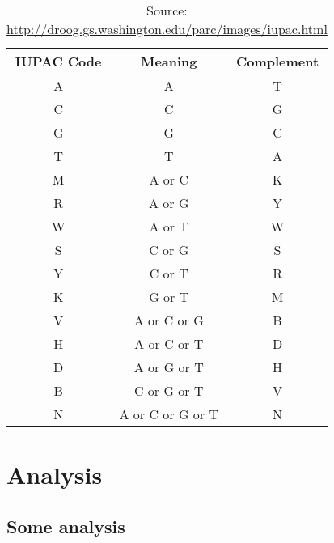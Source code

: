 \documentclass[12pt,a4paper]{article}
\begin{document}
\begin{table}[h!]
    \centering
    \begin{tabular}{|c|c|c|}
    \hline
    IUPAC Code & Meaning & Complement\\
\hline
A & A & T\\
\hline
C & C & G\\
\hline
G & G & C\\
\hline
T & T & A\\
\hline
M & A or C & K\\
\hline
R & A or G & Y\\
\hline
W & A or T & W\\
\hline
S & C or G & S\\
\hline
Y & C or T & R\\
\hline
K & G or T & M\\
\hline
V & A or C or G & B\\
\hline
H & A or C or T & D\\
\hline
D & A or G or T & H\\
\hline
B & C or G or T & V\\
\hline
N & A or C or G or T& N\\
\hline
    \end{tabular}
    \caption{Source: 
    \url{http://droog.gs.washington.edu/parc/images/iupac.html}}
    \label{tab:my_label}
\end{table}

\section{Analysis}

\subsection{Some analysis}
\end{document}

